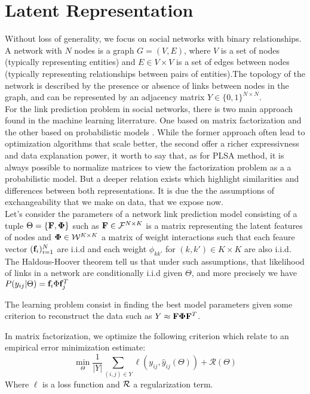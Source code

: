 \section{Latent Representation}
\label{sec:background}
Without loss of generality, we focus on social networks with binary relationships. A network with $N$ nodes is a graph $G = (V,E)$, where $V$ is a set of nodes (typically representing entities) and $E \in V \times V$ is a set of edges between nodes (typically representing relationships between pairs of entities).The topology of the network is described by the presence or absence of links between nodes in the graph, and can be represented by an adjacency matrix $Y \in \{0,1\}^{N\times N}$.\\

For the link prediction problem in social networks, there is two main approach found in the machine learning literrature. One based on matrix factorization \cite{menon2011link} and the other based on probabilistic models \cite{goldenberg2010survey}. While the former approach often lead to optimization algorithms that scale better, the second offer a richer expressivness and data explanation power, it worth to say that, as for PLSA method, it is always possible to normalize matrices to view the factorization problem as a a probabilistic model. But a deeper relation exists which highlight similarities and differences between both representations. It is due the the assumptions of exchangeability that we make on data, that we expose now.\\

Let's consider the parameters of a network link prediction model consisting of a tuple $\Theta = \{ \mathbf{F} , \mathbf{\Phi}\}$ such as $\mathbf{F} \in \mathcal{F}^{N\times K}$ is a matrix representing the latent features of nodes and $\mathbf{\Phi} \in \mathcal{W}^{K\times K}$ a matrix of weight interactions such that each feaure vector $(\mathbf{f}_i)_{i=1}^N$ are i.i.d and each weight $\phi_{kk'}$ for $(k,k') \in K\times K$ are also i.i.d. The Haldous-Hoover theorem \cite{orbanz2015bayesian} tell us that under such assumptions, that likelihood of links in a network are conditionally i.i.d given $\Theta$, and more precisely we have $P(y_{ij}|\Theta) = \mathbf{f}_i \Phi \mathbf{f}_j^T$

The learning problem consist in finding the best model parameters given some criterion to reconstruct the data such as $Y \approx \mathbf{F}\mathbf{\Phi}\mathbf{F}^T$. 

In matrix factorization, we optimize the following criterion which relate to an empirical error minimization estimate:
\begin{displaymath}
    \min\limits_{\Theta} \frac{1}{|Y|} \sum_{(i,j) \in Y} \ell(y_{ij}, \hat y_{ij}(\Theta)) + \mathcal{R}(\Theta)
\end{displaymath}
Where $\ell$ is a loss function and $\cal R$ a regularization term.

